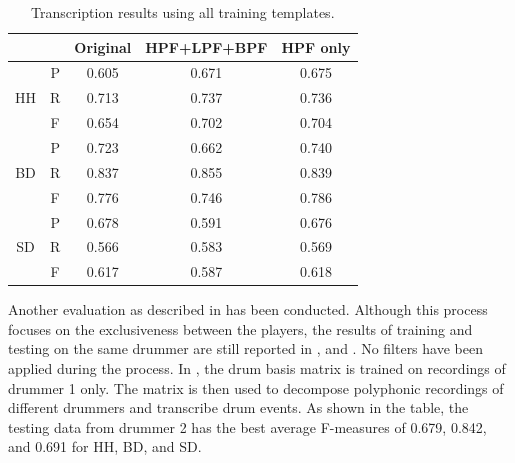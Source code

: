 \documentclass{article}
\begin{document}
\begin{table}[h]
\begin{center}
\begin{tabular}{|c|c|c|c|c|}
\hline
\multicolumn{2}{|c|}{}  & Original & HPF+LPF+BPF & HPF only \\ \hline
\multirow{3}{*}{HH} & P & 0.605    & 0.671       & 0.675    \\ \cline{2-5} 
                    & R & 0.713    & 0.737       & 0.736    \\ \cline{2-5} 
                    & F & 0.654    & 0.702       & 0.704    \\ \hline
\multirow{3}{*}{BD} & P & 0.723    & 0.662       & 0.740    \\ \cline{2-5} 
                    & R & 0.837    & 0.855       & 0.839    \\ \cline{2-5} 
                    & F & 0.776    & 0.746       & 0.786    \\ \hline
\multirow{3}{*}{SD} & P & 0.678    & 0.591       & 0.676    \\ \cline{2-5} 
                    & R & 0.566    & 0.583       & 0.569    \\ \cline{2-5} 
                    & F & 0.617    & 0.587       & 0.618    \\ \hline
\end{tabular}
\end{center}
 \caption{Transcription results using all training templates.}
 \label{tab:basicResults}
\end{table}

Another evaluation as described in  has been conducted. Although this process focuses on the exclusiveness between the players, the results of training and testing on the same drummer are still reported in ,  and . No filters have been applied during the process. In , the drum basis matrix is trained on recordings of drummer 1 only. The matrix is then used to decompose polyphonic recordings of different drummers and transcribe drum events. As shown in the table, the testing data from drummer 2 has the best average F-measures of 0.679, 0.842, and 0.691 for HH, BD, and SD.   
\end{document}
